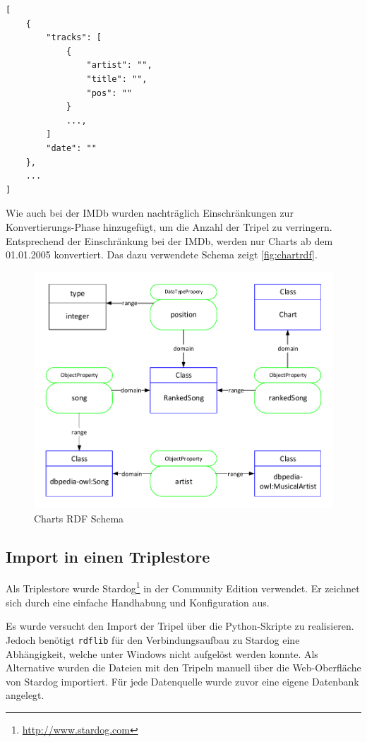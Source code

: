 \documentclass[parskip]{scrartcl}
\begin{document}
\begin{lstlisting}[caption={Offizielle Charts JSON-Format}, label={lst:chartsDeJson}]
[  
    {
        "tracks": [
            {
                "artist": "",
                "title": "",
                "pos": ""
            }
            ...,
        ]
        "date": ""
    },
    ...
]
\end{lstlisting}

Wie auch bei der IMDb wurden nachträglich Einschränkungen zur Konvertierungs-Phase hinzugefügt, um die Anzahl der Tripel zu verringern. Entsprechend der Einschränkung bei der IMDb, werden nur Charts ab dem 01.01.2005 konvertiert. Das dazu verwendete Schema zeigt \autoref{fig:chartrdf}.

\begin{figure}[H]
    \centering
    \includegraphics[scale=0.8]{charts}
    \caption{Charts RDF Schema}
    \label{fig:chartrdf}
\end{figure}

\subsection{Import in einen Triplestore}

Als Triplestore wurde Stardog\footnote{\url{http://www.stardog.com}} in der Community Edition verwendet. Er zeichnet sich durch eine einfache Handhabung und Konfiguration aus.

Es wurde versucht den Import der Tripel über die Python-Skripte zu realisieren. Jedoch benötigt \texttt{rdflib} für den Verbindungsaufbau zu Stardog eine Abhängigkeit, welche unter Windows nicht aufgelöst werden konnte. Als Alternative wurden die Dateien mit den Tripeln manuell über die Web-Oberfläche von Stardog importiert. Für jede Datenquelle wurde zuvor eine eigene Datenbank angelegt.
\end{document}
